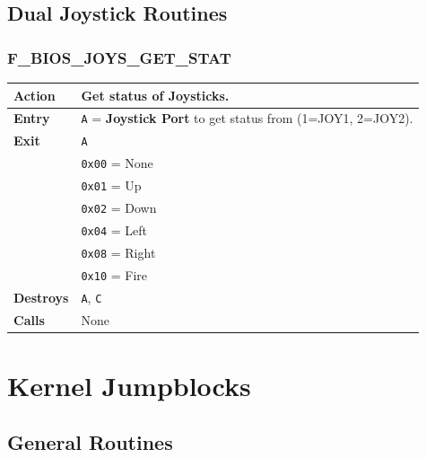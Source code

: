 \documentclass[a4paper,11pt]{article}
\begin{document}
    \subsection{Dual Joystick Routines}

        \subsubsection{F\_BIOS\_JOYS\_GET\_STAT}
        \label{func:fbiosjoysgetstat}
        \begin{tabular}{l p{9cm}}
            \hline\textbf{Action}
            & Get status of Joysticks. \\
            \hline\textbf{Entry} & \texttt{A} = \textbf{Joystick Port} to get
            status from (1=JOY1, 2=JOY2).\\
            \hline\textbf{Exit} & \texttt{A}\\
            & \texttt{0x00} = None\\
            & \texttt{0x01} = Up\\
            & \texttt{0x02} = Down\\
            & \texttt{0x04} = Left\\
            & \texttt{0x08} = Right\\
            & \texttt{0x10} = Fire\\
            \hline\textbf{Destroys} & \texttt{A}, \texttt{C} \\
            \hline\textbf{Calls} & None\\
            \hline
        \end{tabular}

    \pagebreak
    \section{Kernel Jumpblocks}

    \subsection{General Routines}
\end{document}
